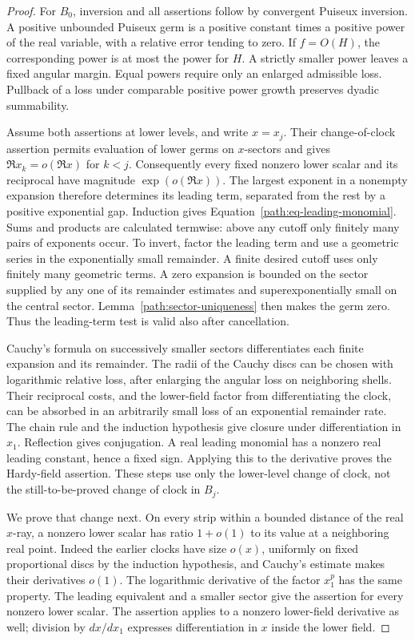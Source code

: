 \begin{proof}
For \(B_0\), inversion and all assertions follow by convergent Puiseux
inversion.  A positive unbounded Puiseux germ is a positive constant
times a positive power of the real variable, with a relative error
tending to zero.  If \(f=O(H)\), the corresponding power is at most the
power for \(H\).  A strictly smaller power leaves a fixed angular
margin.  Equal powers require only an enlarged admissible loss.
Pullback of a loss under comparable positive power growth preserves
dyadic summability.

Assume both assertions at lower levels, and write \(x=x_j\).  Their
change-of-clock assertion permits evaluation of lower germs on
\(x\)-sectors and gives
\(\Re x_k=o(\Re x)\) for \(k<j\).  Consequently every fixed nonzero
lower scalar and its reciprocal have magnitude
\(\exp(o(\Re x))\).  The largest exponent in a nonempty expansion
therefore determines its leading term, separated from the rest by a
positive exponential gap.  Induction gives
Equation~\eqref{path:eq-leading-monomial}.  Sums and products are
calculated termwise: above any cutoff only finitely many pairs of
exponents occur.  To invert, factor the leading term and use a geometric
series in the exponentially small remainder.  A finite desired cutoff
uses only finitely many geometric terms.  A zero expansion is bounded
on the sector supplied by any one of its remainder estimates and
superexponentially small on the central sector.  Lemma~\ref{path:sector-uniqueness}
then makes the germ zero.  Thus the leading-term test is valid also
after cancellation.

Cauchy's formula on successively smaller sectors differentiates each
finite expansion and its remainder.  The radii of the Cauchy discs can
be chosen with logarithmic relative loss, after enlarging the angular
loss on neighboring shells.  Their reciprocal costs, and the
lower-field factor from differentiating the clock, can be absorbed in
an arbitrarily small loss of an exponential remainder rate.  The chain
rule and the induction hypothesis give closure under differentiation
in \(x_1\).  Reflection gives conjugation.  A real leading monomial
has a nonzero real leading constant, hence a fixed sign.  Applying this
to the derivative proves the Hardy-field assertion.  These steps use
only the lower-level change of clock, not the still-to-be-proved
change of clock in \(B_j\).

We prove that change next.  On every strip within a bounded distance
of the real \(x\)-ray, a nonzero lower scalar has ratio \(1+o(1)\) to
its value at a neighboring real point.  Indeed the earlier clocks have
size \(o(x)\), uniformly on fixed proportional discs by the induction
hypothesis, and Cauchy's estimate makes their derivatives \(o(1)\).
The logarithmic derivative of the factor \(x_1^p\) has the same
property.  The leading equivalent and a smaller sector give the
assertion for every nonzero lower scalar.  The assertion applies to a
nonzero lower-field derivative as well; division by \(dx/dx_1\)
expresses differentiation in \(x\) inside the lower field.


\end{proof}
